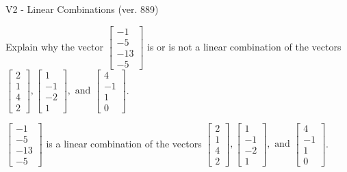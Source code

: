 \begin{exercise}
  \begin{exerciseTitle}V2 - Linear Combinations (ver. 889)\end{exerciseTitle}
  \begin{exerciseStatement}
    Explain why the vector \(\left[\begin{array}{c}
-1 \\
-5 \\
-13 \\
-5
\end{array}\right]\)  is or is not a linear 
	combination of the vectors \(\left[\begin{array}{c}
2 \\
1 \\
4 \\
2
\end{array}\right] , \left[\begin{array}{c}
1 \\
-1 \\
-2 \\
1
\end{array}\right] , \text{ and } \left[\begin{array}{c}
4 \\
-1 \\
1 \\
0
\end{array}\right]\).
	


  \end{exerciseStatement}
  \begin{exerciseAnswer}
   \(\left[\begin{array}{c}
-1 \\
-5 \\
-13 \\
-5
\end{array}\right]\) 
  	 is  
	a linear combination of the vectors \(\left[\begin{array}{c}
2 \\
1 \\
4 \\
2
\end{array}\right] , \left[\begin{array}{c}
1 \\
-1 \\
-2 \\
1
\end{array}\right] , \text{ and } \left[\begin{array}{c}
4 \\
-1 \\
1 \\
0
\end{array}\right]\).

	
  


  \end{exerciseAnswer}
\end{exercise}